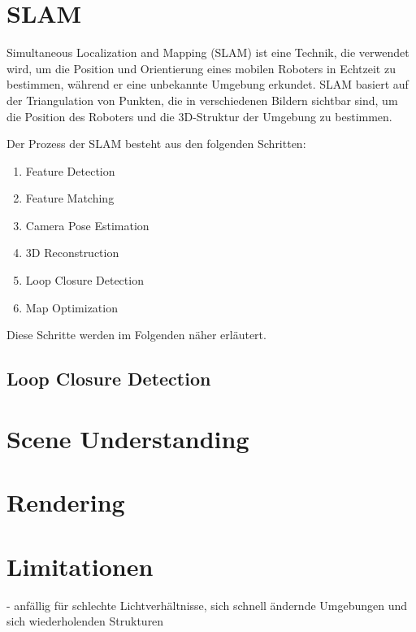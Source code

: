 \section{SLAM}

Simultaneous Localization and Mapping (SLAM) ist eine Technik, die verwendet wird, um die Position und Orientierung eines mobilen Roboters in Echtzeit zu bestimmen, während er eine unbekannte Umgebung erkundet. SLAM basiert auf der Triangulation von Punkten, die in verschiedenen Bildern sichtbar sind, um die Position des Roboters und die 3D-Struktur der Umgebung zu bestimmen.

Der Prozess der SLAM besteht aus den folgenden Schritten:

\begin{enumerate}
    \item Feature Detection
    \item Feature Matching
    \item Camera Pose Estimation
    \item 3D Reconstruction
    \item Loop Closure Detection
    \item Map Optimization
\end{enumerate}

Diese Schritte werden im Folgenden näher erläutert.

\subsection{Loop Closure Detection}

\section{Scene Understanding}

\section{Rendering}

\section{Limitationen}
- anfällig für schlechte Lichtverhältnisse, sich schnell ändernde Umgebungen und sich wiederholenden Strukturen



